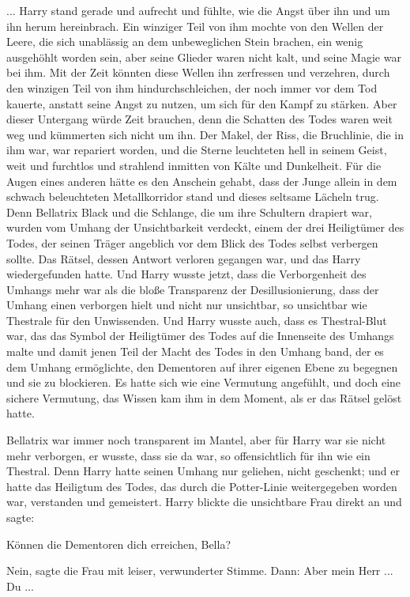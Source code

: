 ... Harry stand gerade und aufrecht und fühlte, wie die Angst über ihn und um
ihn herum hereinbrach. Ein winziger Teil von ihm mochte von den Wellen der
Leere, die sich unablässig an dem unbeweglichen Stein brachen, ein wenig
ausgehöhlt worden sein, aber seine Glieder waren nicht kalt, und seine Magie war
bei ihm. Mit der Zeit könnten diese Wellen ihn zerfressen und verzehren, durch
den winzigen Teil von ihm hindurchschleichen, der noch immer vor dem Tod
kauerte, anstatt seine Angst zu nutzen, um sich für den Kampf zu stärken. Aber
dieser Untergang würde Zeit brauchen, denn die Schatten des Todes waren weit weg
und kümmerten sich nicht um ihn. Der Makel, der Riss, die Bruchlinie, die in ihm
war, war repariert worden, und die Sterne leuchteten hell in seinem Geist, weit
und furchtlos und strahlend inmitten von Kälte und Dunkelheit. Für die Augen
eines anderen hätte es den Anschein gehabt, dass der Junge allein in dem schwach
beleuchteten Metallkorridor stand und dieses seltsame Lächeln trug. Denn
Bellatrix Black und die Schlange, die um ihre Schultern drapiert war, wurden vom
Umhang der Unsichtbarkeit verdeckt, einem der drei Heiligtümer des Todes, der
seinen Träger angeblich vor dem Blick des Todes selbst verbergen sollte. Das
Rätsel, dessen Antwort verloren gegangen war, und das Harry wiedergefunden
hatte. Und Harry wusste jetzt, dass die Verborgenheit des Umhangs mehr war als
die bloße Transparenz der Desillusionierung, dass der Umhang einen verborgen
hielt und nicht nur unsichtbar, so unsichtbar wie Thestrale für den Unwissenden.
Und Harry wusste auch, dass es Thestral-Blut war, das das Symbol der Heiligtümer
des Todes auf die Innenseite des Umhangs malte und damit jenen Teil der Macht
des Todes in den Umhang band, der es dem Umhang ermöglichte, den Dementoren auf
ihrer eigenen Ebene zu begegnen und sie zu blockieren. Es hatte sich wie eine
Vermutung angefühlt, und doch eine sichere Vermutung, das Wissen kam ihm in dem
Moment, als er das Rätsel gelöst hatte.

Bellatrix war immer noch transparent im Mantel, aber für Harry war sie nicht
mehr verborgen, er wusste, dass sie da war, so offensichtlich für ihn wie ein
Thestral. Denn Harry hatte seinen Umhang nur geliehen, nicht geschenkt; und er
hatte das Heiligtum des Todes, das durch die Potter-Linie weitergegeben worden
war, verstanden und gemeistert. Harry blickte die unsichtbare Frau direkt an und
sagte:

\glqq{}Können die Dementoren dich erreichen, Bella?\grqq{}

\glqq{}Nein\grqq{}, sagte die Frau mit leiser, verwunderter Stimme. Dann: \glqq{}
Aber mein Herr ... Du ...\grqq{}

